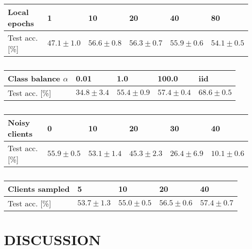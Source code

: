 \documentclass{article}
\begin{document}
\begin{table}
        \footnotesize
        \begin{center}
                \begin{tabular}{l l l l l l}
                        Local epochs & 1 & 10 & 20 & 40 & 80 \\
                        \hline
                        Test acc. [\%] & $47.1 \pm 1.0$ & $56.6 \pm 0.8$ & $56.3 \pm 0.7$ & $55.9 \pm 0.6$ & $54.1 \pm 0.5$ \\
                \end{tabular}
        \end{center}
        \caption{}
        \label{tab:local_epochs}
\end{table}


\begin{table}
        \small
        \begin{center}
                \begin{tabular}{l l l l l}
                        Class balance $\alpha$ & 0.01 & 1.0 & 100.0 & iid \\
                        \hline
                        Test acc. [\%] & $34.8 \pm 3.4$ & $55.4 \pm 0.9$ & $57.4 \pm 0.4$ & $68.6 \pm 0.5$ \\
                \end{tabular}
        \end{center}
        \caption{}
        \label{tab:alpha}
\end{table}
\begin{table}
        \footnotesize
        \begin{center}
                \begin{tabular}{l l l l l l}
                        Noisy clients & 0 & 10 & 20 & 30 & 40 \\
                        \hline
                        Test acc. [\%] & $55.9 \pm 0.5$ & $53.1 \pm 1.4$ & $45.3 \pm 2.3$ & $26.4 \pm 6.9$ & $10.1 \pm 0.6$ \\
                \end{tabular}
        \end{center}
        \caption{}
        \label{tab:noisy_clients}
\end{table}
\begin{table}
        \small
        \begin{center}
                \begin{tabular}{l l l l l}
                        Clients sampled & 5 & 10 & 20 & 40 \\
                        \hline
                        Test acc. [\%] & $53.7 \pm 1.3$ & $55.0 \pm 0.5$ & $56.5 \pm 0.6$ & $57.4 \pm 0.7$ \\
                \end{tabular}
        \end{center}
        \caption{}
        \label{tab:clients_per_round}
\end{table}

\section{DISCUSSION}%
\label{sec:discussion}

\vfill
\pagebreak



\end{document}
